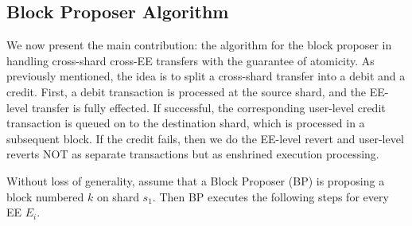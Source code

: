 \documentclass{article}
\begin{document}
\subsection{Block Proposer Algorithm}
We now present the main contribution: the algorithm for the block proposer in handling cross-shard cross-EE transfers with the guarantee of atomicity. As previously mentioned, the idea is to split a cross-shard transfer into a debit and a credit. First, a debit transaction is processed at the source shard, and the EE-level transfer is fully effected. If successful, the corresponding user-level credit transaction is queued on to the destination shard, which is processed in a subsequent block. If the credit fails, then we do the EE-level revert and user-level reverts NOT as separate transactions but as enshrined execution processing. 

Without loss of generality, assume that a Block Proposer (BP) is proposing a block numbered $k$ on shard $s_1$. Then BP executes the following steps for every EE $E_i$. 
\end{document}
